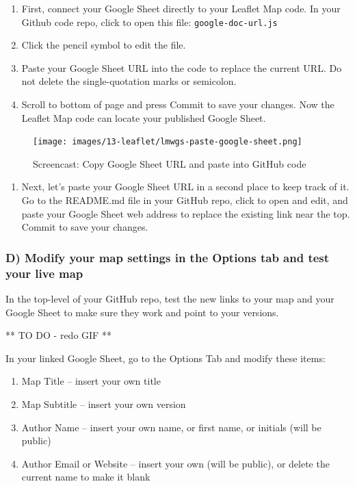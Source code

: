 \documentclass[
  english,
]{book}
\providecommand{\tightlist}{%
  \setlength{\itemsep}{0pt}\setlength{\parskip}{0pt}}
\begin{document}
\begin{enumerate}
\def\labelenumi{\arabic{enumi})}
\item
  First, connect your Google Sheet directly to your Leaflet Map code. In your Github code repo, click to open this file: \texttt{google-doc-url.js}
\item
  Click the pencil symbol to edit the file.
\item
  Paste your Google Sheet URL into the code to replace the current URL. Do not delete the single-quotation marks or semicolon.
\item
  Scroll to bottom of page and press Commit to save your changes. Now the Leaflet Map code can locate your published Google Sheet.
\end{enumerate}

\begin{figure}
\centering
\texttt{[image: images/13-leaflet/lmwgs-paste-google-sheet.png]}
\caption{Screencast: Copy Google Sheet URL and paste into GitHub code}
\end{figure}

\begin{enumerate}
\def\labelenumi{\arabic{enumi})}
\setcounter{enumi}{4}
\tightlist
\item
  Next, let's paste your Google Sheet URL in a second place to keep track of it. Go to the README.md file in your GitHub repo, click to open and edit, and paste your Google Sheet web address to replace the existing link near the top. Commit to save your changes.
\end{enumerate}

\hypertarget{d-modify-your-map-settings-in-the-options-tab-and-test-your-live-map}{%
\subsubsection*{D) Modify your map settings in the Options tab and test your live map}\label{d-modify-your-map-settings-in-the-options-tab-and-test-your-live-map}}

In the top-level of your GitHub repo, test the new links to your map and your Google Sheet to make sure they work and point to your versions.

** TO DO - redo GIF **

In your linked Google Sheet, go to the Options Tab and modify these items:

\begin{enumerate}
\def\labelenumi{\arabic{enumi})}
\item
  Map Title -- insert your own title
\item
  Map Subtitle -- insert your own version
\item
  Author Name -- insert your own name, or first name, or initials (will be public)
\item
  Author Email or Website -- insert your own (will be public), or delete the current name to make it blank
\end{enumerate}
\end{document}
